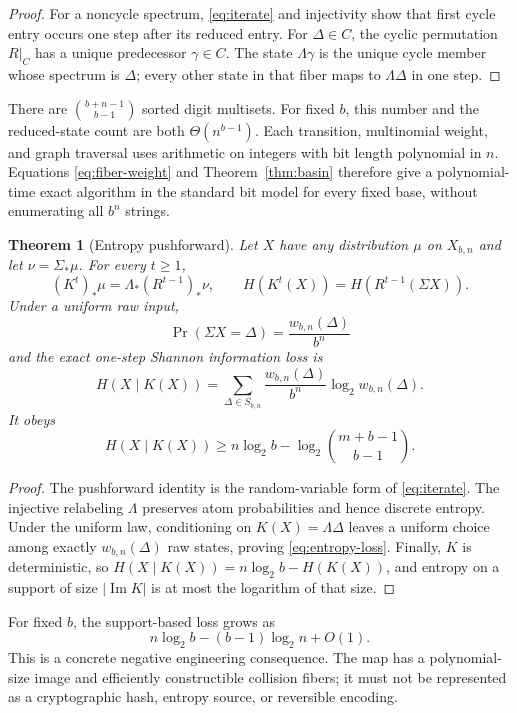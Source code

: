 \documentclass[11pt]{article}
\newtheorem{theorem}{Theorem}[section]
\theoremstyle{definition}
\theoremstyle{remark}
\newcommand{\1}{\mathbf{1}}
\DeclareMathOperator{\ImMap}{Im}
\begin{document}
\begin{proof}
For a noncycle spectrum, \eqref{eq:iterate} and injectivity show that first
cycle entry occurs one step after its reduced entry.  For $\Delta\in C$, the
cyclic permutation $R|_C$ has a unique predecessor $\gamma\in C$.  The state
$\Lambda\gamma$ is the unique cycle member whose spectrum is $\Delta$; every
other state in that fiber maps to $\Lambda\Delta$ in one step.
\end{proof}

There are $\binom{b+n-1}{b-1}$ sorted digit multisets.  For fixed $b$, this
number and the reduced-state count are both $\Theta(n^{b-1})$.  Each transition,
multinomial weight, and graph traversal uses arithmetic on integers with bit
length polynomial in $n$.  Equations \eqref{eq:fiber-weight} and
Theorem~\ref{thm:basin} therefore give a polynomial-time exact algorithm in the
standard bit model for every fixed base, without enumerating all $b^n$ strings.

\begin{theorem}[Entropy pushforward]\label{thm:entropy}
Let $X$ have any distribution $\mu$ on $X_{b,n}$ and let
$\nu=\Sigma_*\mu$.  For every $t\geq1$,
\[
 (K^t)_*\mu=\Lambda_*(R^{t-1})_*\nu,
 \qquad
 H(K^t(X))=H(R^{t-1}(\Sigma X)).
\]
Under a uniform raw input,
\[
 \Pr(\Sigma X=\Delta)=\frac{w_{b,n}(\Delta)}{b^n}
\]
and the exact one-step Shannon information loss is
\begin{equation}\label{eq:entropy-loss}
 H(X\mid K(X))
 =\sum_{\Delta\in S_{b,n}}
   \frac{w_{b,n}(\Delta)}{b^n}\log_2 w_{b,n}(\Delta).
\end{equation}
It obeys
\[
 H(X\mid K(X))
 \geq n\log_2b-\log_2\binom{m+b-1}{b-1}.
\]
\end{theorem}

\begin{proof}
The pushforward identity is the random-variable form of
\eqref{eq:iterate}.  The injective relabeling $\Lambda$ preserves atom
probabilities and hence discrete entropy.  Under the uniform law, conditioning
on $K(X)=\Lambda\Delta$ leaves a uniform choice among exactly
$w_{b,n}(\Delta)$ raw states, proving \eqref{eq:entropy-loss}.  Finally,
$K$ is deterministic, so $H(X\mid K(X))=n\log_2b-H(K(X))$, and entropy on a
support of size $|\ImMap K|$ is at most the logarithm of that size.
\end{proof}

For fixed $b$, the support-based loss grows as
\[
 n\log_2b-(b-1)\log_2n+O(1).
\]
This is a concrete negative engineering consequence.  The map has a
polynomial-size image and efficiently constructible collision fibers; it must
not be represented as a cryptographic hash, entropy source, or reversible
encoding.
\end{document}
